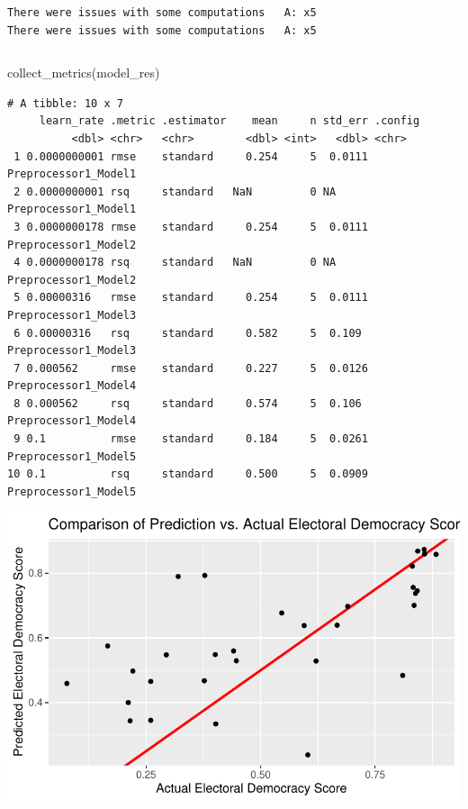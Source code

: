 \documentclass[
  letterpaper,
  DIV=11,
  numbers=noendperiod]{scrartcl}
\newenvironment{Shaded}{\begin{snugshade}}{\end{snugshade}}
\newcommand{\FunctionTok}[1]{\textcolor[rgb]{0.28,0.35,0.67}{#1}}
\newcommand{\NormalTok}[1]{\textcolor[rgb]{0.00,0.23,0.31}{#1}}
\begin{document}
\begin{verbatim}
There were issues with some computations   A: x5
There were issues with some computations   A: x5
\end{verbatim}

\begin{verbatim}
\end{verbatim}

\begin{Shaded}
\begin{Highlighting}[]
\FunctionTok{collect\_metrics}\NormalTok{(model\_res)}
\end{Highlighting}
\end{Shaded}

\begin{verbatim}
# A tibble: 10 x 7
     learn_rate .metric .estimator    mean     n std_err .config             
          <dbl> <chr>   <chr>        <dbl> <int>   <dbl> <chr>               
 1 0.0000000001 rmse    standard     0.254     5  0.0111 Preprocessor1_Model1
 2 0.0000000001 rsq     standard   NaN         0 NA      Preprocessor1_Model1
 3 0.0000000178 rmse    standard     0.254     5  0.0111 Preprocessor1_Model2
 4 0.0000000178 rsq     standard   NaN         0 NA      Preprocessor1_Model2
 5 0.00000316   rmse    standard     0.254     5  0.0111 Preprocessor1_Model3
 6 0.00000316   rsq     standard     0.582     5  0.109  Preprocessor1_Model3
 7 0.000562     rmse    standard     0.227     5  0.0126 Preprocessor1_Model4
 8 0.000562     rsq     standard     0.574     5  0.106  Preprocessor1_Model4
 9 0.1          rmse    standard     0.184     5  0.0261 Preprocessor1_Model5
10 0.1          rsq     standard     0.500     5  0.0909 Preprocessor1_Model5
\end{verbatim}

\includegraphics{Episode_2_files/figure-pdf/finalfit-1.pdf}
\end{document}
